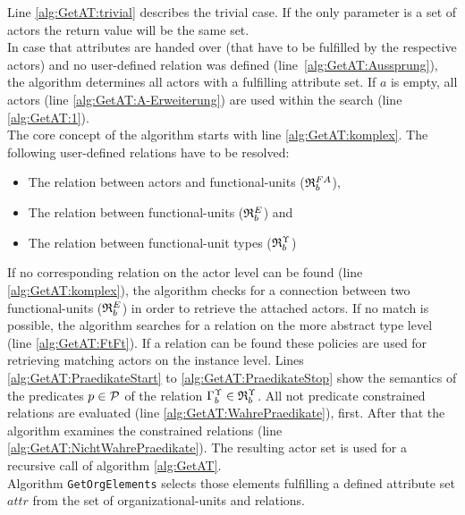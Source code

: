 \noindent Line \ref{alg:GetAT:trivial} describes the trivial case. If the only parameter is a set of actors the return value will be the same set.\\

In case that attributes are handed over (that have to be fulfilled by the respective actors) and no user-defined relation was defined (line~\ref{alg:GetAT:Aussprung}), the algorithm determines all actors with a fulfilling attribute set. If $a$ is empty, all actors (line \ref{alg:GetAT:A-Erweiterung}) are used within the search (line \ref{alg:GetAT:1}). \\
		
The core concept of the algorithm starts with line \ref{alg:GetAT:komplex}. The following user-defined relations have to be resolved:
\begin{itemize}
	\item The relation between actors and functional-units (${\mathfrak{R}}^{FA}_{b}$), 
	\item The relation between functional-units ($\relmengebenutzerinstOE_F$) and 
	\item The relation between functional-unit types (${\mathfrak{R}}^{\Upsilon}_{b}$)
\end{itemize}
	
If no corresponding relation on the actor level can be found (line \ref{alg:GetAT:komplex}), the algorithm checks for a connection between two functional-units ($\relmengebenutzerinstOE_F$) in order to retrieve the attached actors. If no match is possible, the algorithm searches for a relation on the more abstract type level (line \ref{alg:GetAT:FtFt}). If a relation can be found these policies are used for retrieving matching actors on the instance level. Lines \ref{alg:GetAT:PraedikateStart} to \ref{alg:GetAT:PraedikateStop} show the semantics of the predicates $p \in \mathcal{P}$ of the relation ${\Gamma}^{\Upsilon}_{b} \in {\mathfrak{R}}^{\Upsilon}_{b}$. All not predicate constrained relations are evaluated (line \ref{alg:GetAT:WahrePraedikate}), first. After that the algorithm examines the constrained relations (line \ref{alg:GetAT:NichtWahrePraedikate}).  The resulting actor set is used for a recursive call of algorithm \ref{alg:GetAT}.\\
		
\noindent Algorithm {\tt GetOrgElements} selects those elements fulfilling a defined attribute set $attr$ from the set of organizational-units and relations.
		
